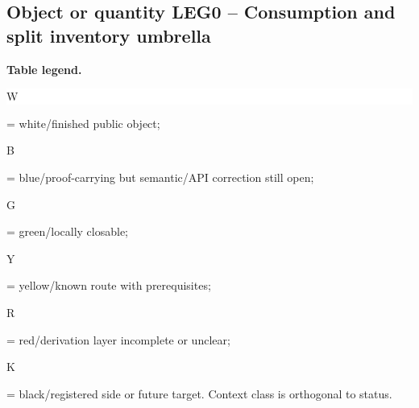 \subsection*{Object or quantity LEG0 -- Consumption and split inventory umbrella}
\hypertarget{objproof:LEG0}{}
\par\smallskip\noindent\begin{minipage}{0.99\linewidth}\footnotesize\raggedright\textbf{Table legend.} \colorbox{white}{\strut W} = white/finished public object; \colorbox{cyan!20}{\strut B} = blue/proof-carrying but semantic/API correction still open; \colorbox{green!18}{\strut G} = green/locally closable; \colorbox{yellow!25}{\strut Y} = yellow/known route with prerequisites; \colorbox{red!20}{\strut R} = red/derivation layer incomplete or unclear; \colorbox{black!18}{\strut K} = black/registered side or future target. Context class is orthogonal to status.\end{minipage}\par\vspace{0.25em}
